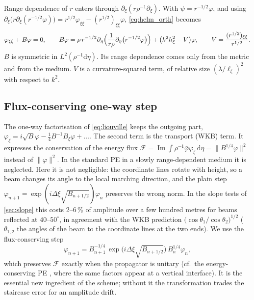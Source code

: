 \documentclass[11pt,a4paper]{article}
\theoremstyle{remark}
\newcommand{\dd}{\mathrm{d}}
\newcommand{\pd}{\partial}
\begin{document}
Range dependence of $r$ enters through $\pd_\xi(r\rho^{-1}\pd_\xi)$. With
$\psi=r^{-1/2}\varphi$, and using
$\pd_\xi\bigl(r\pd_\xi(r^{-1/2}\varphi)\bigr)=r^{1/2}\varphi_{\xi\xi}-(r^{1/2})_{\xi\xi}\varphi$,
\eqref{eq:helm_orth} becomes
\begin{equation}\label{eq:liouville}
\varphi_{\xi\xi}+B\varphi=0,\qquad
B\varphi=\rho\,r^{-1/2}\pd_\eta\Bigl(\frac{1}{r\rho}\pd_\eta\bigl(r^{-1/2}\varphi\bigr)\Bigr)+\bigl(k^2h_\xi^2-V\bigr)\varphi,\qquad
V=\frac{(r^{1/2})_{\xi\xi}}{r^{1/2}} .
\end{equation}
$B$ is symmetric in $L^2(\rho^{-1}\dd\eta)$. Its range dependence comes only from
the metric and from the medium. $V$ is a curvature-squared term, of relative
size $(\lambda/\ell_\xi)^2$ with respect to $k^2$.

\subsection{Flux-conserving one-way step}

The one-way factorisation of \eqref{eq:liouville} keeps the outgoing part,
$\varphi_\xi=i\sqrt B\varphi-\frac14B^{-1}B_\xi\varphi+\dots$. The second term is
the transport (WKB) term. It expresses the conservation of the energy flux
$\mathcal F=\operatorname{Im}\int\rho^{-1}\bar\varphi\varphi_\xi\,\dd\eta=\|B^{1/4}\varphi\|^2$
instead of $\|\varphi\|^2$. In the standard PE in a slowly range-dependent medium
it is neglected. Here it is not negligible: the coordinate lines rotate with
height, so a beam changes its angle to the local marching direction, and the
plain step $\varphi_{n+1}=\exp(i\Delta\xi\sqrt{B_{n+1/2}})\varphi_n$ preserves
the wrong norm. In the slope tests of \cref{sec:slope} this costs 2--6\,\% of
amplitude over a few hundred metres for beams reflected at $40$--$50^\circ$, in
agreement with the WKB prediction $\bigl(\cos\theta_1/\cos\theta_2\bigr)^{1/2}$
($\theta_{1,2}$ the angles of the beam to the coordinate lines at the two ends).
We use the flux-conserving step
\begin{equation}\label{eq:flux_step}
\varphi_{n+1}=B_{n+1}^{-1/4}\,\exp\bigl(i\Delta\xi\sqrt{B_{n+1/2}}\bigr)\,B_{n}^{1/4}\varphi_n,
\end{equation}
which preserves $\mathcal F$ exactly when the propagator is unitary (cf.\ the
energy-conserving PE \cite{collins1991energy,porter1991energy}, where the same
factors appear at a vertical interface). It is the essential new ingredient of
the scheme; without it the transformation trades the staircase error for an
amplitude drift.
\end{document}
